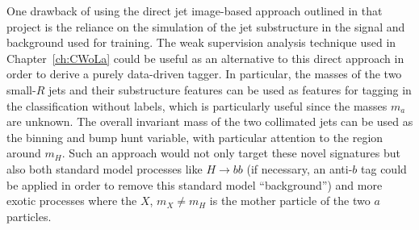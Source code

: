 One drawback of using the direct jet image-based approach outlined in that project is the reliance on the simulation of the jet substructure in the signal and background used for training.
The weak supervision analysis technique used in Chapter~\ref{ch:CWoLa} could be useful as an alternative to this direct approach in order to derive a purely data-driven tagger.
In particular, the masses of the two small-$R$ jets and their substructure features can be used as features for tagging in the classification without labels, which is particularly useful since the masses $m_a$ are unknown.
The overall invariant mass of the two collimated jets can be used as the binning and bump hunt variable, with particular attention to the region around $m_H$.
Such an approach would not only target these novel signatures but also both standard model processes like $H\rightarrow bb$ (if necessary, an anti-$b$ tag could be applied in order to remove this standard model ``background'') and more exotic processes where the $X$, $m_X \ne m_H$ is the mother particle of the two $a$ particles.
